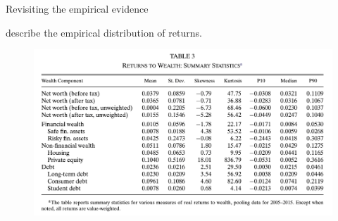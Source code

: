 \documentclass{beamer}
\begin{document}
\begin{frame}{Revisiting the empirical evidence}

\cite{aflgdmlp20} describe the empirical distribution of returns.



  \vfill
   \begin{figure}
    \centering
    \includegraphics[width=.75\linewidth]{Figures/Fagereng2020Table3.png}
  \end{figure}
  \vfill

\end{frame}
 





\end{document}
